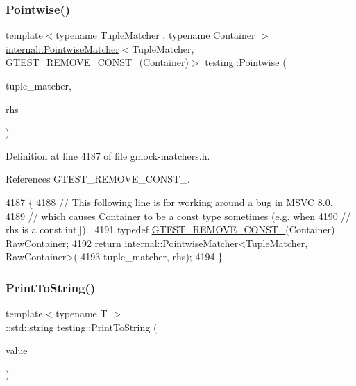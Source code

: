 \subsubsection{\texorpdfstring{Pointwise()}{Pointwise()}}
{\footnotesize\ttfamily template$<$typename Tuple\+Matcher , typename Container $>$ \\
\hyperlink{classtesting_1_1internal_1_1PointwiseMatcher}{internal\+::\+Pointwise\+Matcher}$<$Tuple\+Matcher, \hyperlink{gtest-internal_8h_a2ffec8c60510eb130af387f5ce9a756a}{G\+T\+E\+S\+T\+\_\+\+R\+E\+M\+O\+V\+E\+\_\+\+C\+O\+N\+S\+T\+\_\+}(Container)$>$ testing\+::\+Pointwise (\begin{DoxyParamCaption}\item[{const Tuple\+Matcher \&}]{tuple\+\_\+matcher,  }\item[{const Container \&}]{rhs }\end{DoxyParamCaption})\hspace{0.3cm}{\ttfamily [inline]}}



Definition at line 4187 of file gmock-\/matchers.\+h.



References G\+T\+E\+S\+T\+\_\+\+R\+E\+M\+O\+V\+E\+\_\+\+C\+O\+N\+S\+T\+\_\+.


\begin{DoxyCode}
4187                                                                    \{
4188   \textcolor{comment}{// This following line is for working around a bug in MSVC 8.0,}
4189   \textcolor{comment}{// which causes Container to be a const type sometimes (e.g. when}
4190   \textcolor{comment}{// rhs is a const int[])..}
4191   \textcolor{keyword}{typedef} \hyperlink{gtest-internal_8h_a2ffec8c60510eb130af387f5ce9a756a}{GTEST\_REMOVE\_CONST\_}(Container) RawContainer;
4192   \textcolor{keywordflow}{return} internal::PointwiseMatcher<TupleMatcher, RawContainer>(
4193       tuple\_matcher, rhs);
4194 \}
\end{DoxyCode}
\mbox{\label{namespacetesting_aa5717bb1144edd1d262d310ba70c82ed}} 
\subsubsection{\texorpdfstring{Print\+To\+String()}{PrintToString()}}
{\footnotesize\ttfamily template$<$typename T $>$ \\
\+::std\+::string testing\+::\+Print\+To\+String (\begin{DoxyParamCaption}\item[{const T \&}]{value }\end{DoxyParamCaption})}



